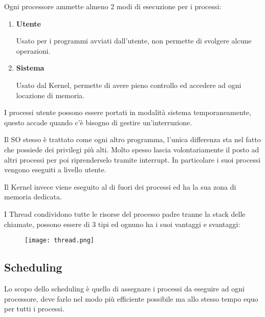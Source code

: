\documentclass{article}
\begin{document}
\noindent Ogni processore ammette almeno 2 modi di esecuzione per i processi:
\begin{enumerate}
    \item \textbf{Utente}

        Usato per i programmi avviati dall'utente, non permette di svolgere alcune operazioni.
    
    \item \textbf{Sistema}

        Usato dal Kernel, permette di avere pieno controllo ed accedere ad ogni locazione di memoria.
    
\end{enumerate}

\noindent I processi utente possono essere portati in modalità sistema temporaneamente, questo accade quando c'è bisogno di gestire un'interruzione.\newline

\noindent Il SO stesso è trattato come ogni altro programma, l'unica differenza sta nel fatto che possiede dei privilegi più alti. Molto spesso lascia volontariamente il posto ad altri processi per poi riprenderselo tramite interrupt. In particolare i suoi processi vengono eseguiti a livello utente.\newline

\noindent Il Kernel invece viene eseguito al di fuori dei processi ed ha la sua zona di memoria dedicata.\newline

\newpage

\noindent I Thread condividono tutte le risorse del processo padre tranne la stack delle chiamate, possono essere di 3 tipi ed ognuno ha i suoi vantaggi e svantaggi:

\begin{figure}[ht]
    \centering
    \texttt{[image: thread.png]}
    \label{fig:thread}
\end{figure}

\subsection{Scheduling}

Lo scopo dello scheduling è quello di assegnare i processi da eseguire ad ogni processore, deve farlo nel modo più efficiente possibile ma allo stesso tempo equo per tutti i processi.\newline
\end{document}
